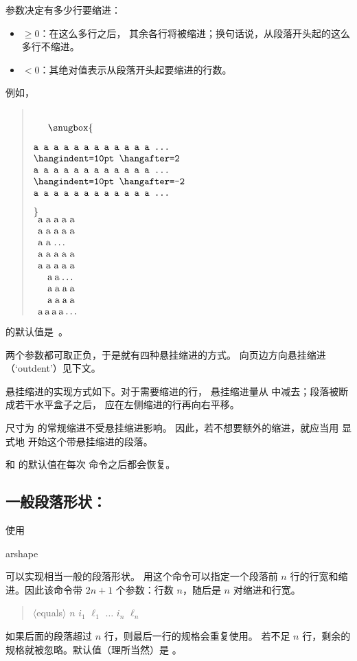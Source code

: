\documentclass[a4paper]{rapport3}
\makeatletter
\def\gr#1{$\langle$#1$\rangle$}\def\key#1{{\tt#1}}
\newenvironment{disp}{\begin{quotation}}{\end{quotation}}
\def\cstoidx#1\par{\index{#1@\cs{#1}}}
\def\csidx#1{\cstoidx #1\par\cs{#1}}
\makeatother
\begin{document}
 参数决定有多少行要缩进：
\begin{itemize}\item {}${}\geq0$：在这么多行之后，
其余各行将被缩进；换句话说，从段落开头起的这么多行不缩进。
\item {}${}<0$：其绝对值表示从段落开头起要缩进的行数。\end{itemize}
例如，
\begin{disp}\leavevmode\hbox{%
$\vcenter{\snugbox{\begin{verbatim}
 a a a a a a a a a a a a ...

 \hangindent=10pt \hangafter=2
 a a a a a a a a a a a a ...

 \hangindent=10pt \hangafter=-2
 a a a a a a a a a a a a ...
\end{verbatim}
}}$%
$\vcenter{\parindent0pt \setbox0\hbox{a a a a a}\hsize\wd0
 \leftskip=0pt %
 a a a a a a a a a a a a \dots\par%
 \hangindent=10pt \hangafter=2
 a a a a a a a a a a a a \dots\par%
 \hangindent=10pt \hangafter=-2
 a a a a a a a a a a a a \dots\par}$
}\end{disp}
 的默认值是~。

两个参数都可取正负，于是就有四种悬挂缩进的方式。
向页边方向悬挂缩进（`outdent'）见下文。

悬挂缩进的实现方式如下。对于需要缩进的行，
悬挂缩进量从  中减去；段落被断成若干水平盒子之后，
应在左侧缩进的行再向右平移。

尺寸为  的常规缩进不受悬挂缩进影响。
因此，若不想要额外的缩进，就应当用  显式地
开始这个带悬挂缩进的段落。

 和  的默认值在每次  命令之后都会恢复。

\subsection{一般段落形状：}

使用 \csidx{parshape} 可以实现相当一般的段落形状。
用这个命令可以指定一个段落前 $n$ 行的行宽和缩进。因此该命令带
$2n+1$ 个参数：行数 $n$，随后是 $n$ 对缩进和行宽。
\begin{disp} \gr{equals}
    $n$ $i_1$ $\ell_1$ $\ldots$ $i_n$ $\ell_n$\end{disp}
如果后面的段落超过 $n$ 行，则最后一行的规格会重复使用。
若不足 $n$ 行，剩余的规格就被忽略。默认值（理所当然）是
。
\end{document}
